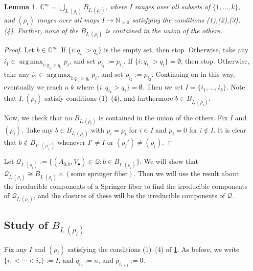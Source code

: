 \documentclass[12pt,psamsfonts]{article}
\DeclareMathOperator*{\argmax}{arg\,max}
\newtheorem{lemma}[theorem]{Lemma}
\begin{document}
\begin{lemma}\label{bs_union}
    \(\mathbb{C}^m = \bigcup_{I, (\rho_i)} B_{I, (\rho_i)}\), where \(I\) ranges over all subsets of \(\{1, ..., k\}\), and \((\rho_i)\) ranges over all maps \(I \to \mathbb{N}_{>0}\) satisfying the conditions (1),(2),(3),(4).
    Further, none of the \(B_{I, (\rho_i)}\) is contained in the union of the others.
\end{lemma}
\begin{proof}
    Let \(b \in \mathbb{C}^m\).
    If \(\{i : q_{i_0} > q_i\}\) is the empty set, then stop.
    Otherwise, take any \(i_1 \in \argmax_{i : q_{i_0} > q_i} p_i\), and set \(\rho_{i_1} := p_{i_1}\).
    If \(\{i : q_{i_1} > q_i\} = \emptyset\), then stop.
    Otherwise, take any \(i_2 \in \argmax_{i : q_{i_1} > q_i} p_i\), and set \(\rho_{i_2} := p_{i_2}\).
    Continuing on in this way, eventually we reach a \(k\) where \(\{i : q_{i_k} > q_i\} = \emptyset\).
    Then we set \(I = \{i_1, ..., i_k\}\).
    Note that \(I, (\rho_i)\) satisfy conditions (1)--(4), and furthermore \(b \in B_{I, (\rho_i)}\).
    \par Now, we check that no \(B_{I, (\rho_i)}\) is contained in the union of the others.
    Fix \(I\) and \((\rho_i)\).
    Take any \(b \in B_{I, (\rho_i)}\) with \(p_i = \rho_i\) for \(i \in I\) and \(p_i = 0\) for \(i \notin I\).
    It is clear that \(b \notin B_{I', (\rho_i')}\) whenever \(I' \neq I\) or \((\rho_i') \neq (\rho_i)\).
\end{proof}
\par Let \(\mathcal{Q}_{I, (\rho_i)} := \{(A_{0, b}, V_\bullet) \in \mathcal{Q} : b \in B_{I, (\rho_i)}\}\).
We will show that \(\mathcal{Q}_{I, (\rho_i)} \cong B_{I, (\rho_i)} \times (\textrm{some springer fiber})\).
Then we will use the result about the irreducible components of a Springer fiber to find the irreducible components of \(\mathcal{Q}_{I, (\rho_i)}\), and the closures of these will be the irreducible components of \(\mathcal{Q}\).

\subsection{Study of \texorpdfstring{\(B_{I, (\rho_i)}\)}{B\_\{I, (p\_i)\}}}
Fix any \(I\) and \((\rho_i)\) satisfying the conditions (1)--(4) of \cref{bs_union}.
As before, we write \(\{i_1 < \cdots < i_r\} := I\), and \(q_{i_0} := n\), and \(p_{i_{r + 1}} := 0\).
\end{document}
